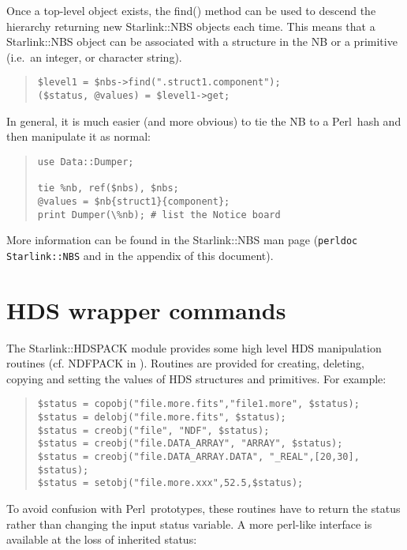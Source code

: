 \documentclass[twoside,11pt]{article}
\newenvironment{myquote}{\begin{quote}\begin{small}}{\end{small}\end{quote}}
\newcommand{\Kappa}{\xref{{\sc{Kappa}}}{sun95}{}}
\newcommand{\perl}{\xref{\textsf{Perl}}{sun193}{}}
\newcommand{\xref}[3]{#1}
\renewcommand{\_}{\texttt{\symbol{95}}}
\begin{document}
Once a top-level object exists, the find() method can be used to 
descend the hierarchy returning new Starlink::NBS objects each time.
This means that a Starlink::NBS object can be associated with a structure
in the NB or a primitive (i.e.\ an integer, or character string).

\begin{myquote}
\begin{verbatim}
$level1 = $nbs->find(".struct1.component");
($status, @values) = $level1->get;
\end{verbatim}
\end{myquote}

In general, it is much easier (and more obvious) to tie the NB
to a \perl\ hash and then manipulate it as normal:

\begin{myquote}
\begin{verbatim}
use Data::Dumper;

tie %nb, ref($nbs), $nbs;
@values = $nb{struct1}{component};
print Dumper(\%nb); # list the Notice board
\end{verbatim}
\end{myquote}

More information can be found in the Starlink::NBS man page
(\texttt{perldoc Starlink::NBS} and in the appendix of this document).


\section{HDS wrapper commands}
 
The Starlink::HDSPACK module provides some high level HDS manipulation
routines (cf. NDFPACK in \Kappa). Routines are provided for creating,
deleting, copying and setting the values of HDS structures and primitives. For
example:

\begin{myquote}
\begin{verbatim}
$status = copobj("file.more.fits","file1.more", $status);
$status = delobj("file.more.fits", $status);
$status = creobj("file", "NDF", $status);
$status = creobj("file.DATA_ARRAY", "ARRAY", $status);
$status = creobj("file.DATA_ARRAY.DATA", "_REAL",[20,30], $status);
$status = setobj("file.more.xxx",52.5,$status);
\end{verbatim}
\end{myquote}

To avoid confusion with \perl\ prototypes, these routines have to return
the status rather than changing the input status variable. A more perl-like
interface is available at the loss of inherited status:
\end{document}
